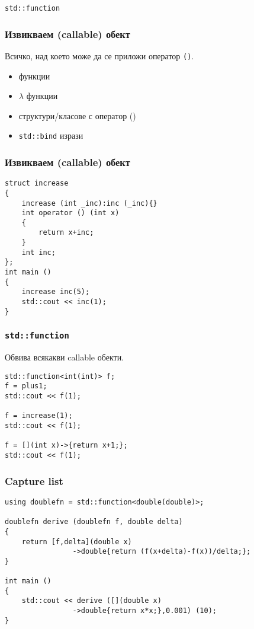 \documentclass{beamer}
\begin{document}
\begin{frame}
    \centerline{\texttt{std::function}}
\end{frame}


\begin{frame}[fragile]
\frametitle{Извикваем (callable) обект}

Всичко, над което може да се приложи оператор \texttt{()}.

\begin{itemize}
    \item функции
    \item $\lambda$ функции
    \item структури/класове с оператор ()
    \item \texttt{std::bind} изрази
\end{itemize}

\end{frame}

\begin{frame}[fragile]
    \frametitle{Извикваем (callable) обект}

\begin{lstlisting}[basicstyle=\small]
struct increase
{
    increase (int _inc):inc (_inc){}
    int operator () (int x)
    {
        return x+inc;
    }
    int inc;
};
int main ()
{
    increase inc(5);
    std::cout << inc(1);
}    
\end{lstlisting}    
\end{frame}
    

\begin{frame}[fragile]
    \frametitle{\texttt{std::function}}

Обвива всякакви callable обекти.
\bigskip

\begin{lstlisting}[basicstyle=\small]
std::function<int(int)> f;
f = plus1; 
std::cout << f(1);

f = increase(1); 
std::cout << f(1);

f = [](int x)->{return x+1;}; 
std::cout << f(1);
\end{lstlisting}    
\end{frame}



\begin{frame}[fragile]
    \frametitle{Capture list}
    
\begin{lstlisting}[basicstyle=\small]
using doublefn = std::function<double(double)>;

doublefn derive (doublefn f, double delta)
{ 
    return [f,delta](double x)
                ->double{return (f(x+delta)-f(x))/delta;};
}

int main ()
{
    std::cout << derive ([](double x)
                ->double{return x*x;},0.001) (10);
}
\end{lstlisting}
\end{frame}
\end{document}
